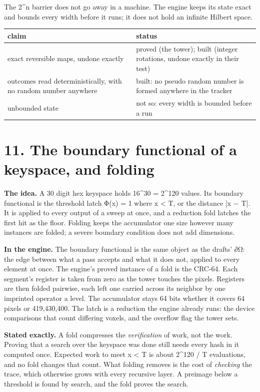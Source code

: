 The 2\textasciicircum{}n barrier does not go away in a machine. The engine keeps its state exact and bounds every width before it runs; it does not hold an infinite Hilbert space.

{\small
\setlength{\tabcolsep}{6pt}
\begin{longtable}{>{\RaggedRight\arraybackslash}p{}>{\RaggedRight\arraybackslash}p{}}
\toprule
claim & status \\
\midrule
\endhead
exact reversible maps, undone exactly & proved (the tower); built (integer rotations, undone exactly in their test) \\
outcomes read deterministically, with no random number anywhere & built: no pseudo random number is formed anywhere in the tracker \\
unbounded state & not so: every width is bounded before a run \\
\bottomrule
\end{longtable}
}

\section{\texorpdfstring{11. The boundary functional of a keyspace, and folding}{11. The boundary functional of a keyspace, and folding}}

\textbf{The idea.} A 30 digit hex keyspace holds 16\textasciicircum{}30 = 2\textasciicircum{}120 values. Its boundary functional is the threshold latch Φ(x) = 1 where x < T, or the distance |x − T|. It is applied to every output of a sweep at once, and a reduction fold latches the first hit as the floor. Folding keeps the accumulator one size however many instances are folded; a severe boundary condition does not add dimensions.

\textbf{In the engine.} The boundary functional is the same object as the drafts' ∂Ω: the edge between what a pass accepts and what it does not, applied to every element at once. The engine's proved instance of a fold is the CRC-64. Each segment's register is taken from zero as the tower touches the pixels. Registers are then folded pairwise, each left one carried across its neighbor by one imprinted operator a level. The accumulator stays 64 bits whether it covers 64 pixels or 419,430,400. The latch is a reduction the engine already runs: the device comparisons that count differing voxels, and the overflow flag the tower sets.

\textbf{Stated exactly.} A fold compresses the \emph{verification} of work, not the work. Proving that a search over the keyspace was done still needs every hash in it computed once. Expected work to meet x < T is about 2\textasciicircum{}120 / T evaluations, and no fold changes that count. What folding removes is the cost of \emph{checking} the trace, which otherwise grows with every recursive layer. A preimage below a threshold is found by search, and the fold proves the search.

